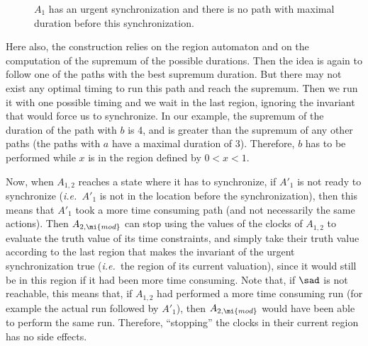 \documentclass{LMCS}
\theoremstyle{plain}\newtheorem*{prop11}{Proposition~\ref{prop:states} bis}
\def\ie{{\em i.e.\ }}
\begin{document}
\begin{figure}[t]
  \centering
  \def\b{3.7}
  \caption{$A_1$ has an urgent synchronization and there is no path with
  maximal duration before this synchronization.}\label{fig:urgent2}
\end{figure}

Here also, the construction relies on the region automaton and on the
computation of the supremum of the possible durations. Then the idea is again to
follow one of the paths with the best supremum duration. But there may not exist
any optimal timing to run this path and reach the supremum. Then we run it with
one possible timing and we wait in the last region, ignoring the invariant that
would force us to synchronize.
In our example, the supremum of the duration of the path
with $b$ is 4, and is greater than the supremum
of any other paths (the paths with $a$ have a maximal duration of 3).
Therefore, $b$ has to be performed while $x$ is in the region defined by
$0<x<1$.


Now, when $A_{1,2}$ reaches a state where it has to synchronize, if
$A'_1$ is not ready to synchronize (\ie $A'_1$ is not in the location
before the synchronization), then this means that $A'_1$ took
a more time consuming path (and not necessarily the same actions).
Then $A_{2,\mi{mod}}$ can stop using the values of the clocks of $A_{1,2}$ to
evaluate the truth value of its time constraints, and simply take their truth value according to the last region that makes
the invariant of the urgent synchronization true (\ie the region of its current
valuation), since it would still be in this region if it had been more time consuming.
Note that, if $\sad$ is not reachable, this means that, if $A_{1,2}$ had
performed a more time consuming run (for example the actual run followed by $A'_1$),
then $A_{2,\mi{mod}}$ would have been able to perform the same run.
Therefore, ``stopping'' the clocks in their current region has no
side effects.
\end{document}
